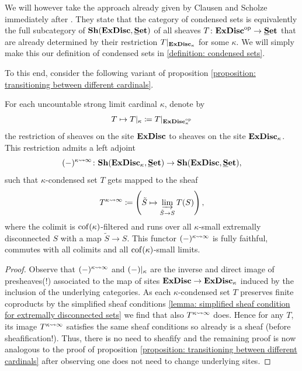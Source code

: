 \begin{remark}
	We will however take the approach already given by Clausen and Scholze immediately after \cite[Definition 2.11]{condenseddotpdf}. They state that the category of condensed sets is equivalently the full subcategory of $\Sheaves{\extremallyDisconnectedSets}{\Set}$ of all sheaves $T\colon {\mathbf{ExDisc}}^{\mathrm{op}} \to {{\mathbf{\underline{S}et}}}$ that are already determined by their restriction $T{\vert_{{\mathbf{ExDisc}}_{\kappa}}}$ for some $\kappa$. We will simply make this our definition of condensed sets in \ref{definition: condensed sets}.
\end{remark}
	
To this end, consider the following variant of proposition \ref{proposition: transitioning between different cardinals}.
\begin{proposition}
	\label{proposition: unbounded transitioning}
	
	For each uncountable strong limit cardinal $\kappa$, denote by
		$$T\mapsto T{\vert_{\kappa}}\coloneqq T\vert_{{\mathbf{ExDisc}}_{\kappa}^{\mathrm{op}}}$$
	the restriction of sheaves on the site ${\mathbf{ExDisc}}$ to sheaves on the site ${\mathbf{ExDisc}}_{\kappa}$. This restriction admits a left adjoint
		$$(-)^\enlargementsymbol{\kappa}{\infty}\colon\Sheaves{\boundedExtremallyDisconnectedSets{\kappa}}{\Set} \to \Sheaves{\extremallyDisconnectedSets}{\Set},$$
	such that $\kappa$-condensed set $T$ gets mapped to the sheaf
		$$T^{\kappa\rightsquigarrow \infty} \coloneqq \left(\tilde S\mapsto \varinjlim_{\tilde S\to S} T(S)\right),$$
	where the colimit is ${\operatorname{cof}(\kappa)}$-filtered and runs over all $\kappa$-small extremally disconnected $S$ with a map $\tilde S\to S$. This functor $(-)^{\kappa\rightsquigarrow \infty}$ is fully faithful, commutes with all colimits and all ${\operatorname{cof}(\kappa)}$-small limits.
\end{proposition}
\begin{proof}
	Observe that $(-)^{\kappa\rightsquigarrow \infty}$ and $(-){\vert_{\kappa}}$ are the inverse and direct image of presheaves(!) associated to the map of sites ${\mathbf{ExDisc}}\to{\mathbf{ExDisc}}_{\kappa}$ induced by the inclusion of the underlying categories. As each $\kappa$-condensed set $T$ preserves finite coproducts by the simplified sheaf conditions \ref{lemma: simplified sheaf condition for extremally disconnected sets} we find that also $T^{\kappa\rightsquigarrow \infty}$ does. Hence for any $T$, its image $T^{\kappa\rightsquigarrow \infty}$ satisfies the same sheaf conditions so already is a sheaf (before sheafification!). Thus, there is no need to sheafify and the remaining proof is now analogous to the proof of proposition \ref{proposition: transitioning between different cardinals} after observing one does not need to change underlying sites.
\end{proof}

